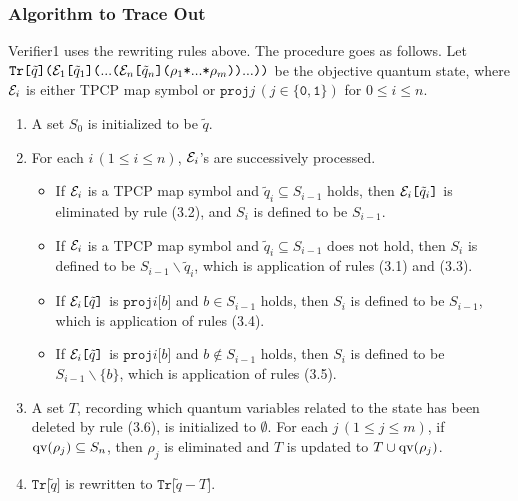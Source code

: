 \subsubsection{Algorithm to Trace Out}
Verifier1 uses the rewriting rules above.
The procedure goes as follows. Let
$\mathtt{Tr}\texttt{[}\tilde q\texttt{]}\texttt{(}\mathcal{E}_1\texttt{[}\tilde q_1\texttt{]}
\texttt{(}...\texttt{(}\mathcal{E}_n\texttt{[}\tilde 
q_n\texttt{](}\rho_1 \texttt{*} ... \texttt{*} \rho_m \texttt{))}...
\texttt{)}\texttt{)}$
be the objective quantum state, where $\mathcal{E}_i$ is either TPCP map symbol or
$\mathtt{proj}j \, (j \in \{\mathtt{0}, \mathtt{1}\})$ for $0 \le i \le n$.
\begin{enumerate}
 \item A set $S_0$ is initialized to be $\tilde q$.
 \item For each $i\,(1 \leq i \leq n)$, $\mathcal{E}_i$'s are
       successively processed.
       \begin{itemize}
	\item If $\mathcal{E}_i$ is a TPCP
	      map symbol and $\tilde q_i \subseteq S_{i - 1}$ holds,
	      then 
	      $\mathcal{E}_i\texttt{[}\tilde q_i\texttt{]}$ is
	      eliminated by rule (3.2), and $S_i$ is defined to be
	      $S_{i - 1}$.
	\item If $\mathcal{E}_i$ is a TPCP map symbol and $\tilde q_i \subseteq
	      S_{i - 1}$ does not hold, then 
	      $S_i$ is defined to be $S_{i - 1}\backslash \tilde
	      q_i$, which is application of rules (3.1) and (3.3).
	\item If $\mathcal{E}_i\texttt{[}\tilde q\texttt{]}$ is
	      $\mathtt{proj}i\texttt{[}b\texttt{]}$
	      and $b \in S_{i - 1}$ holds, then 
	      $S_i$ is defined to be $S_{i - 1}$,
	      which is application of rules (3.4).
	\item If $\mathcal{E}_i\texttt{[}\tilde q\texttt{]}$ is
	      $\mathtt{proj}i\texttt{[}b\texttt{]}$
	      and $b \notin S_{i - 1}$ holds, then 
	      $S_i$ is defined to be $S_{i - 1}\backslash \{b\}$,
	      which is application of rules (3.5).
       \end{itemize}
 \item A set $T$, recording which quantum variables related to
       the state has been deleted by rule (3.6), is initialized
       to $\emptyset$.
       For each $j\,(1 \leq j \leq m)$, if $\mathrm{qv}(\rho_j) \subseteq S_n$,
       then $\rho_j$ is eliminated and $T$ is updated to 
       $T \cup \mathrm{qv}(\rho_j)$.
 \item $\texttt{Tr[}\tilde q \texttt{]}$ is rewritten to
       $\texttt{Tr[}\tilde q - T \texttt{]}$.
\end{enumerate}
